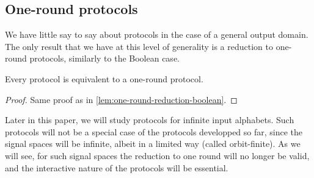 


\subsection{One-round protocols}

We have little say to say about  protocols in the case of a general output
domain. The  only result that we have at this level of generality is a
reduction to one-round protocols, similarly to the Boolean case.

\begin{lemma}
\label{lemma:one-round-reduction-general}
  Every protocol is equivalent to a one-round protocol.
\end{lemma}
\begin{proof}
  Same proof as in \cref{lem:one-round-reduction-boolean}. 
\end{proof}

 Later in this paper, we will study protocols for infinite input alphabets. Such protocols will not be a special case of the protocols developped so far, since the signal spaces will be infinite, albeit in a limited way (called orbit-finite).  As we will see, for such signal spaces the reduction to one round will no longer be valid, and the interactive nature of the protocols will be essential.
